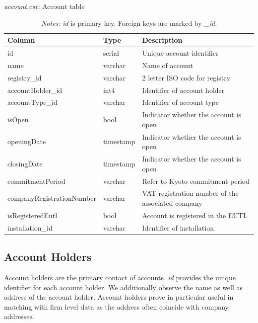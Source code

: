 \documentclass[authoryear]{elsarticle}
\begin{document}
\begin{table}[htbp]\scriptsize
	\caption{\textit{account.csv}: Account table}\label{tab:tbl_account}
	\centering
	\begin{tabular*}{\textwidth}{@{}@{\extracolsep{\fill}} lll @{}}
		\toprule
		\toprule
		\textbf{Column } & \textbf{Type} & \textbf{Description}\\
		\midrule
		id    & serial & Unique account identifier \\
		name  & varchar & Name of account \\
		registry\_id & varchar & 2 letter ISO code for registry \\
		accountHolder\_id & int4  & Identifier of account holder \\
		accountType\_id & varchar & Identifier of account type \\
		isOpen & bool  & Indicator whether the account is open  \\
		openingDate & timestamp & Indicator whether the account is open  \\
		closingDate & timestamp & Indicator whether the account is open  \\
		commitmentPeriod & varchar & Refer to Kyoto commitment period \\
		companyRegistrationNumber & varchar & VAT registration number of the associated company \\
		isRegisteredEutl & bool  & Account is registered in the EUTL \\
		installation\_id & varchar & Identifier of installation \\
		\bottomrule
		\bottomrule
	\end{tabular*}%
	\vspace{-3ex}
\caption*{\footnotesize \emph{Notes:} \textit{id} is primary key. Foreign keys are marked by \textit{\_id}.}
\vspace{0ex}
\end{table}

\subsection{Account Holders}

Account holders are the primary contact of accounts. \textit{id} provides the unique identifier for each account holder. We additionally observe the name as well as address of the account holder. Account holders prove in particular useful in matching with firm level data as the address often coincide with company addresses. 
\end{document}
